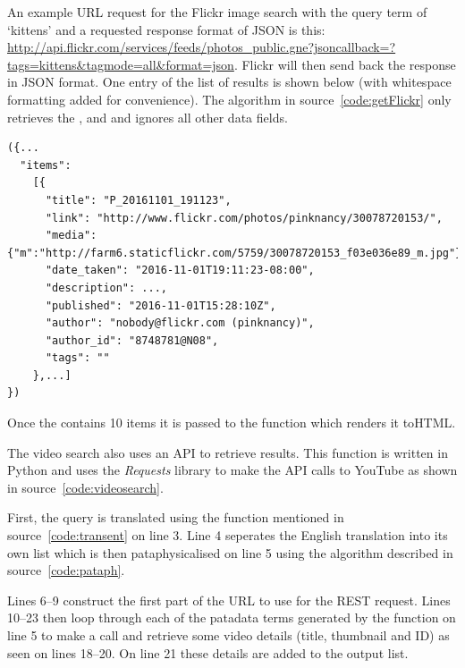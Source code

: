 An example \ac{URL} request for the Flickr image search with the query term of `kittens' and a requested response format of \ac{JSON} is this:
\url{http://api.flickr.com/services/feeds/photos_public.gne?jsoncallback=?tags=kittens&tagmode=all&format=json}. Flickr will then send back the response in \ac{JSON} format. One entry of the list of results is shown below (with whitespace formatting added for convenience). The algorithm in source~\ref{code:getFlickr} only retrieves the ,  and  and ignores all other data fields.

\begin{verbatim}
({...
  "items": 
    [{
      "title": "P_20161101_191123",
      "link": "http://www.flickr.com/photos/pinknancy/30078720153/",
      "media": {"m":"http://farm6.staticflickr.com/5759/30078720153_f03e036e89_m.jpg"},
      "date_taken": "2016-11-01T19:11:23-08:00",
      "description": ...,
      "published": "2016-11-01T15:28:10Z",
      "author": "nobody@flickr.com (pinknancy)",
      "author_id": "8748781@N08",
      "tags": ""
    },...]
})
\end{verbatim}

Once the  contains 10 items it is passed to the  function which renders it to\ac{HTML}.

\spirals

The video search also uses an \ac{API} to retrieve results. This function is written in Python and uses the \textit{Requests} library to make the \ac{API} calls to YouTube \autocite{YouTubeAPI} as shown in source~\ref{code:videosearch}.

First, the query is translated using the  function mentioned in source~\ref{code:transent} on line 3. Line 4 seperates the English translation into its own list  which is then pataphysicalised on line 5 using the algorithm described in source~\ref{code:pataph}.

Lines 6--9 construct the first part of the \ac{URL} to use for the \ac{REST} request. Lines 10--23 then loop through each of the patadata terms generated by the  function on line 5 to make a call and retrieve some video details (title, thumbnail and ID) as seen on lines 18--20. On line 21 these details are added to the output list. 

